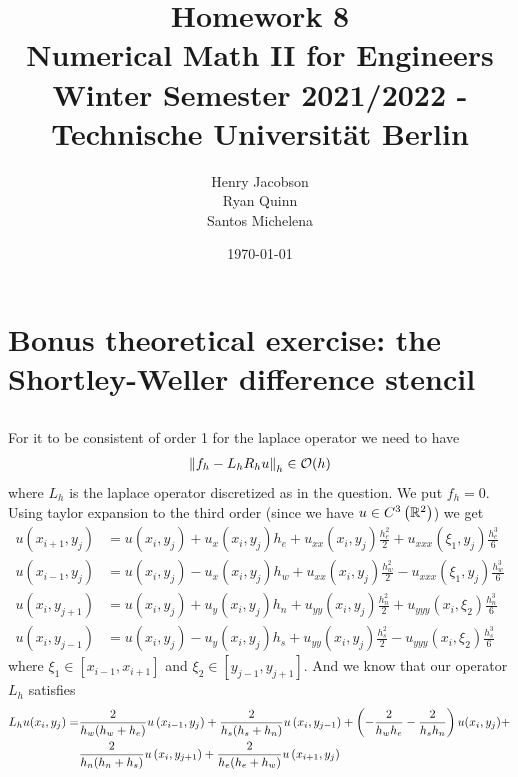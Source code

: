 \documentclass{homework}
\title{Homework 8\\Numerical Math II for Engineers\\Winter Semester 2021/2022 - Technische Universität Berlin}
\author{Henry Jacobson\\Ryan Quinn\\Santos Michelena}
\date{\today}
\begin{document}
\maketitle

\section{Bonus theoretical exercise: the Shortley-Weller difference stencil}
\subsection{}
For it to be consistent of order 1 for the laplace operator we need to have 
\begin{align}
    \norm{f_h-L_hR_hu}_h\in\mathcal{O}(h)
\end{align}
where $L_h$ is the laplace operator discretized as in the question. We put $f_h=0$. Using taylor expansion
to the third order (since we have $u\in C^3\left(\mathbb{R}^2\right)$) we get
\newcommand{\xii}{x_{i}}
\newcommand{\xim}{x_{i-1}}
\newcommand{\xip}{x_{i+1}}
\newcommand{\yii}{y_{j}}
\newcommand{\yip}{y_{j+1}}
\newcommand{\yim}{y_{j-1}}
\begin{align}
    u(\xip,\yii) &= u(\xii,\yii) + u_x(\xii,\yii)h_e + u_{xx}(\xii,\yii)\frac{h_e^2}{2} + u_{xxx}(\xi_1,\yii)\frac{h_e^3}{6} 
    \label{x i+1}
    \\
    u(\xim,\yii) &= u(\xii,\yii) - u_x(\xii,\yii)h_w + u_{xx}(\xii,\yii)\frac{h_w^2}{2} - u_{xxx}(\xi_1,\yii)\frac{h_w^3}{6} 
    \label{x i-1}
    \\
    u(\xii,\yip) &= u(\xii,\yii) + u_y(\xii,\yii)h_n + u_{yy}(\xii,\yii)\frac{h_n^2}{2} + u_{yyy}(\xii,\xi_2)\frac{h_n^3}{6} 
    \label{y i+1}
    \\
    u(\xii,\yim) &= u(\xii,\yii) - u_y(\xii,\yii)h_s + u_{yy}(\xii,\yii)\frac{h_s^2}{2} - u_{yyy}(\xii,\xi_2)\frac{h_s^3}{6} 
    \label{y i-1}
\end{align}
where $\xi_1\in [x_{i-1},x_{i+1}]$ and $\xi_2\in[y_{j-1},y_{j+1}]$.
And we know that our operator $L_h$ satisfies
\begin{align}
    \begin{aligned}
    L_hu(\xii,\yii) =&
    \frac{2}{h_w(h_w+h_e)}u\pth{\xim,\yii} + 
    \frac{2}{h_s(h_s+h_n)}u\pth{\xii,\yim} +
    \pth{-\frac{2}{h_wh_e}-\frac{2}{h_sh_n}}u(\xii,\yii) +\\&
    \frac{2}{h_n(h_n+h_s)}u\pth{\xii,\yip} +
    \frac{2}{h_e(h_e+h_w)}u\pth{\xip,\yii}
    \label{shortley weller diff stencil}
\end{aligned}
\end{align}
\end{document}
